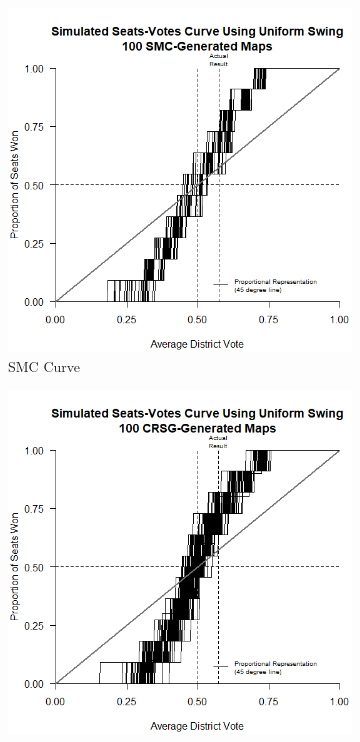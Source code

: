 \begin{figure}[h]
    \caption{\hyperref[sec:seatsvotes]{Seats-Votes curves} for \hyperref[sec:smc]{SMC}- and \hyperref[sec:crsg]{CRSG}-Generated Maps and Existing Map}
    \begin{subfigure}[b]{0.45\textwidth}
        \includegraphics[width=\textwidth]{img/sv.smc.png}
        \caption{SMC Curve}
        \label{fig:sv.smc}
    \end{subfigure}
    \hfill
    \begin{subfigure}[b]{0.45\textwidth}
        \includegraphics[width=\textwidth]{img/sv.crsg.png}

\end{subfigure}
\end{figure}
